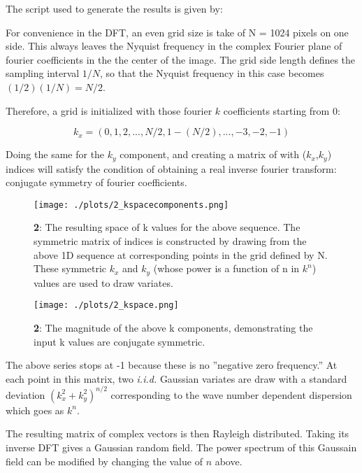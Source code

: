 The script used to generate the results is given by:




For convenience in the DFT, an even grid size is take of N = 1024 pixels on one side. This always leaves the Nyquist frequency in the complex Fourier plane of fourier coefficients in the the center of the image. The grid side length defines the sampling interval $1/N$, so that the Nyquist frequency in this case becomes $(1/2)(1/N) = N/2$.

Therefore, a grid is initialized with those fourier $k$ coefficients starting from 0:

\begin{equation}
    k_x=(0,1,2, ... , N/2, 1- (N/2), ... , -3,-2,-1)
\end{equation}

Doing the same for the $k_y$ component, and creating a matrix of with ($k_x$,$k_y$) indices will satisfy the condition of obtaining a real inverse fourier transform: conjugate symmetry of fourier coefficients.


\begin{figure}[h!]
  \centering
  \texttt{[image: ./plots/2\_kspacecomponents.png]}
  \caption{\textbf{2}: The resulting space of k values for the above sequence. The symmetric matrix of indices is constructed by drawing from the above 1D sequence at corresponding points in the grid defined by N. These symmetric $k_x$ and $k_y$ (whose power is a function of n in $k^n$) values are used to draw variates.}
  \label{fig:kspace}
\end{figure}


\begin{figure}[h!]
  \centering
  \texttt{[image: ./plots/2\_kspace.png]}
  \caption{\textbf{2}: The magnitude of the above k components, demonstrating the input k values are conjugate symmetric.}
  \label{fig:kspace}
\end{figure}

The above series stops at -1 because these is no ''negative zero frequency.'' At each point in this matrix, two \textit{i.i.d.} Gaussian variates are draw with a standard deviation $(k_x^2+k_y^2)^{n/2}$ corresponding to the wave number dependent dispersion which goes as $k^n$.

The resulting matrix of complex vectors is then Rayleigh distributed. Taking its inverse DFT gives a Gaussian random field. The power spectrum of this Gaussain field can be modified by changing the value of $n$ above.

